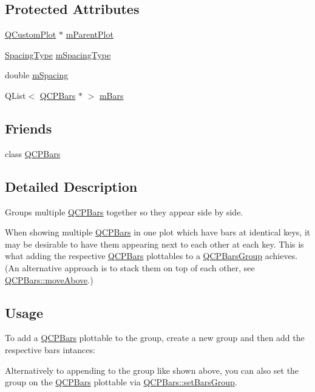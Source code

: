 \subsection*{Protected Attributes}
\begin{DoxyCompactItemize}
\item 
\hyperlink{class_q_custom_plot}{Q\+Custom\+Plot} $\ast$ \hyperlink{class_q_c_p_bars_group_a973d408cfbf88db95115aec71877f9e7}{m\+Parent\+Plot}
\item 
\hyperlink{class_q_c_p_bars_group_a4c0521120a97e60bbca37677a37075b6}{Spacing\+Type} \hyperlink{class_q_c_p_bars_group_a6794ee1a9c81864d627bff6a4b2d64ec}{m\+Spacing\+Type}
\item 
double \hyperlink{class_q_c_p_bars_group_a56471d7f548ca6141b7a5bf9629f7ece}{m\+Spacing}
\item 
Q\+List$<$ \hyperlink{class_q_c_p_bars}{Q\+C\+P\+Bars} $\ast$ $>$ \hyperlink{class_q_c_p_bars_group_aa5affa0639c13e05bda9d23f16dd1393}{m\+Bars}
\end{DoxyCompactItemize}
\subsection*{Friends}
\begin{DoxyCompactItemize}
\item 
class \hyperlink{class_q_c_p_bars_group_a721b87c7cdb8e83a90d77fc8a22e7195}{Q\+C\+P\+Bars}
\end{DoxyCompactItemize}


\subsection{Detailed Description}
Groups multiple \hyperlink{class_q_c_p_bars}{Q\+C\+P\+Bars} together so they appear side by side. 



When showing multiple \hyperlink{class_q_c_p_bars}{Q\+C\+P\+Bars} in one plot which have bars at identical keys, it may be desirable to have them appearing next to each other at each key. This is what adding the respective \hyperlink{class_q_c_p_bars}{Q\+C\+P\+Bars} plottables to a \hyperlink{class_q_c_p_bars_group}{Q\+C\+P\+Bars\+Group} achieves. (An alternative approach is to stack them on top of each other, see \hyperlink{class_q_c_p_bars_ac22e00a6a41509538c21b04f0a57318c}{Q\+C\+P\+Bars\+::move\+Above}.)\hypertarget{class_q_c_p_bars_group_qcpbarsgroup-usage}{}\subsection{Usage}\label{class_q_c_p_bars_group_qcpbarsgroup-usage}
To add a \hyperlink{class_q_c_p_bars}{Q\+C\+P\+Bars} plottable to the group, create a new group and then add the respective bars intances\+: 
\begin{DoxyCodeInclude}
\end{DoxyCodeInclude}
Alternatively to appending to the group like shown above, you can also set the group on the \hyperlink{class_q_c_p_bars}{Q\+C\+P\+Bars} plottable via \hyperlink{class_q_c_p_bars_aedd1709061f0b307c47ddb45e172ef9a}{Q\+C\+P\+Bars\+::set\+Bars\+Group}.

